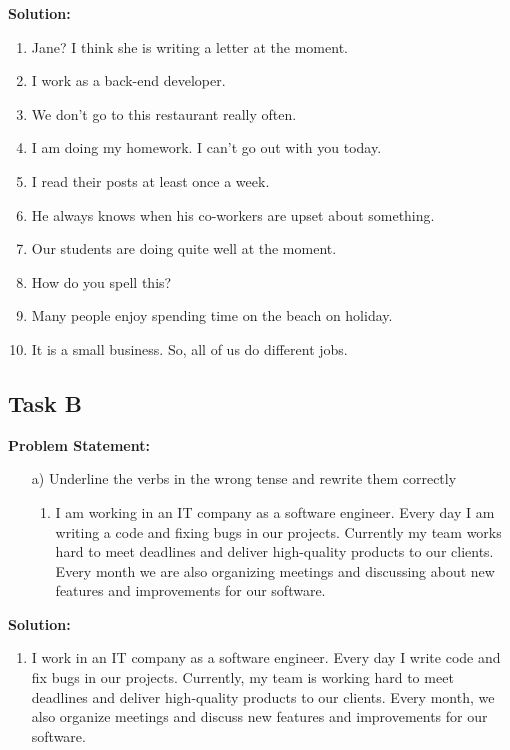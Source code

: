 \documentclass[a4paper,12pt]{article}
\begin{document}
\textbf{Solution:}

\begin{enumerate}
        \item Jane? I think she is writing a letter at the moment.
        \item I work as a back-end developer.
        \item We don’t go to this restaurant really often.
        \item I  am doing my homework. I can’t go out with you today.
        \item I read their posts at least once a week.
        \item He always knows when his co-workers are upset about something.
        \item Our students are doing quite well at the moment.
        \item How do you spell this?
        \item Many people enjoy spending time on the beach on holiday.
        \item It is a small business. So, all of us do different jobs.
    \end{enumerate}
    
\vspace{1cm}

\subsection{Task B}
\textbf{Problem Statement:}
\begin{itemize}
    \item[a)]  Underline the verbs in the wrong tense and rewrite them correctly
        \begin{enumerate}
            \item I am working in an IT company as a software engineer. Every day I am writing a code and fixing bugs in our projects. Currently my team works hard to meet deadlines and deliver high-quality products
            to our clients. Every month we are also organizing meetings and discussing about new features and
            improvements for our software.
        \end{enumerate}
\end{itemize}

\textbf{Solution:}

\begin{enumerate}
            \item I work in an IT company as a software engineer. Every day I write code and fix bugs in our projects. Currently, my team is working hard to meet deadlines and deliver high-quality products to our clients. Every month, we also organize meetings and discuss new features and improvements for our software. 
\end{enumerate}
\end{document}
